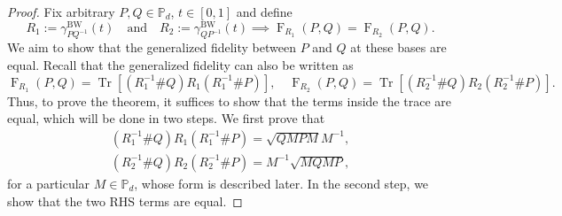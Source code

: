 \documentclass[12pt]{article}
\theoremstyle{definition}
\begin{document}
\begin{proof}
Fix arbitrary $P, Q \in \mathbb{P}_d$, $t \in [0,1]$ and define
\begin{equation}
R_1 := \gamma^{\mathrm{BW}}_{PQ^{-1}}(t) \quad \text{and} \quad R_2 := \gamma^{\mathrm{BW}}_{QP^{-1}}(t) \implies \operatorname{F}_{R_1}(P,Q)  = \operatorname{F}_{R_2}(P,Q).
\end{equation}
We aim to show that the generalized fidelity between $P$ and $Q$ at these bases are equal. Recall that the generalized fidelity can also be written as
\begin{equation}
\operatorname{F}_{R_1}(P,Q) = \operatorname{Tr}\left[(R_1^{-1} \# Q)  R_1 (R_1^{-1} \# P)\right],
\quad \operatorname{F}_{R_2}(P,Q) = \operatorname{Tr}\left[(R_2^{-1} \# Q) R_2 ( R_2^{-1} \# P)\right].
\end{equation}
Thus, to prove the theorem, it suffices to show that the terms inside the trace are equal, which will be done in two steps. We first prove that 
\begin{align}
    (R_1^{-1} \# Q)  R_1 (R_1^{-1} \# P) = \sqrt{Q M P M} M ^{-1}, \\
    (R_2^{-1} \# Q)  R_2 (R_2^{-1} \# P) = M ^{-1} \sqrt{M Q M P},
\end{align}
for a particular $M \in \mathbb P_d$, whose form is described later. In the second step, we show that the two RHS terms are equal. 


\end{proof}
\end{document}
